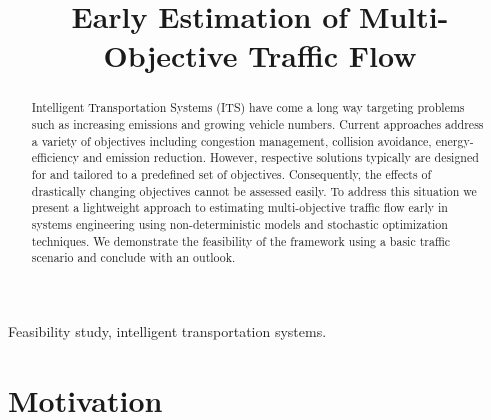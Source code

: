\documentclass[conference]{../cls/IEEEtran}
\begin{document}
\title{Early Estimation of Multi-Objective Traffic Flow}

\author{
	\and
}

\maketitle

\begin{abstract}
Intelligent Transportation Systems (ITS) have come a long way targeting
problems such as increasing emissions and growing vehicle numbers. Current approaches address a variety of objectives including congestion management, collision avoidance, energy-efficiency and emission reduction. However, respective solutions typically are designed for and tailored to a predefined set of objectives. Consequently, the effects of drastically changing objectives cannot be assessed easily. To address this situation we present a lightweight approach to estimating multi-objective traffic flow early in systems engineering using non-deterministic models and stochastic optimization techniques. We demonstrate the feasibility of the framework using a basic traffic scenario and conclude with an outlook.
\end{abstract}

\begin{IEEEkeywords}
Feasibility study, intelligent transportation systems.
\end{IEEEkeywords}

\section{Motivation}
\label{sec:motivation}
\end{document}
